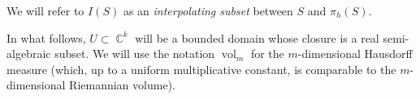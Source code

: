 \documentclass[12pt]{amsbook}%
\theoremstyle{definition}
\theoremstyle{remark}
\newtheorem{rem}[thm]{Remark}
\numberwithin{section}{chapter}
\numberwithin{subsection}{section}
\numberwithin{figure}{chapter}
\DeclareMathOperator{\C}{\mathbb{C}}
\DeclareMathOperator{\Ker}{Ker}
\DeclareMathOperator{\vol}{vol}
\DeclareMathOperator{\R}{\mathbb{R}}
\newcommand\bac[1]{{\color{blue} #1} }
\def\cH{{\mathscr{H}}}
\def\kap{}
\begin{document}
{{We will refer to $I(S)$ as an {\em interpolating subset} between $S$ and $\pi_h(S)$. 



 In what follows, $U\subset \C^k$ will be a bounded domain whose closure 
is a real semi-algebraic subset. We will use the notation $\vol_m$ for the $m$-dimensional Hausdorff measure (which, up to a uniform multiplicative constant,  is comparable to the $m$-dimensional Riemannian volume). 




%
%
%
% 
%


}}
\end{document}
